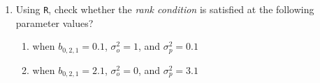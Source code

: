 \begin{enumerate}
    \item Using \texttt{R}, check whether the \emph{rank condition} is satisfied at the following parameter values?

          \begin{enumerate}[label=\roman*.]
              \item when $b_{0, 2, 1} = 0.1$, $\sigma_o^2 = 1$, and $\sigma_p^2 = 0.1$

              \item when $b_{0, 2, 1} = 2.1$, $\sigma_o^2 = 0$, and $\sigma_p^2 = 3.1$
          \end{enumerate}
%
%              
\end{enumerate}